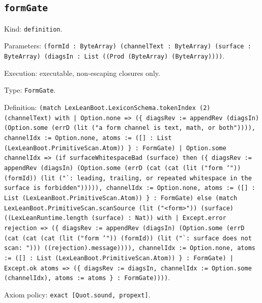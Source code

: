 \documentclass[11pt]{article}
\begin{document}
\subsection*{\texttt{formGate}}
\noindent Kind: \texttt{definition}.\par
\noindent Parameters: \texttt{(formId : ByteArray) (channelText : ByteArray) (surface : ByteArray) (diagsIn : List ((Prod (ByteArray) (ByteArray))))}.\par
\noindent Execution: executable, non-escaping closures only.\par
\noindent Type: \texttt{FormGate}.\par
\noindent Definition: \texttt{(match LexLeanBoot.LexiconSchema.tokenIndex (2) (channelText) with | Option.none => (\{ diagsRev := appendRev (diagsIn) (Option.some (errD (lit ("a form channel is text, math, or both")))), channelIdx := Option.none, atoms := ([] : List (LexLeanBoot.PrimitiveScan.Atom)) \} : FormGate) | Option.some channelIdx => (if surfaceWhitespaceBad (surface) then (\{ diagsRev := appendRev (diagsIn) (Option.some (errD (cat (cat (lit ("form `")) (formId)) (lit ("`: leading, trailing, or repeated whitespace in the surface is forbidden"))))), channelIdx := Option.none, atoms := ([] : List (LexLeanBoot.PrimitiveScan.Atom)) \} : FormGate) else (match LexLeanBoot.PrimitiveScan.scanSource (lit ("<form>")) (surface) ((LexLeanRuntime.length (surface) : Nat)) with | Except.error rejection => (\{ diagsRev := appendRev (diagsIn) (Option.some (errD (cat (cat (cat (lit ("form `")) (formId)) (lit ("`: surface does not scan: "))) ((rejection).message)))), channelIdx := Option.none, atoms := ([] : List (LexLeanBoot.PrimitiveScan.Atom)) \} : FormGate) | Except.ok atoms => (\{ diagsRev := diagsIn, channelIdx := Option.some (channelIdx), atoms := atoms \} : FormGate))))}.\par
\noindent Axiom policy: \texttt{exact [Quot.sound, propext]}.\par
\end{document}
